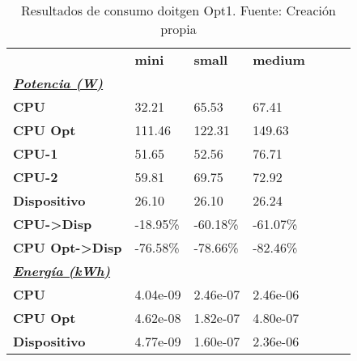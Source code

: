 \begin{table}[H]
    \centering
    \begin{tabular}{lllllll}
    \rowcolor[HTML]{DAE8FC} \ & \textbf{mini} & \textbf{	small} & \textbf{	medium} \\
    \cellcolor[HTML]{DAE8FC} \textbf{\textbf{{\emph{{\underline{{Potencia (W)}}}}}}} &  & 	 & 	 \\
    \rowcolor[HTML]{EFEFEF} \cellcolor[HTML]{DAE8FC} \textbf{CPU} & 32.21 & 	65.53 & 	67.41 \\
    \cellcolor[HTML]{DAE8FC} \textbf{CPU Opt} & 111.46 & 	122.31 & 	149.63 \\
    \rowcolor[HTML]{EFEFEF} \cellcolor[HTML]{DAE8FC} \textbf{\quad CPU-1} & 51.65 & 	52.56 & 	76.71 \\
    \cellcolor[HTML]{DAE8FC} \textbf{\quad CPU-2} & 59.81 & 	69.75 & 	72.92 \\
    \rowcolor[HTML]{EFEFEF} \cellcolor[HTML]{DAE8FC} \textbf{Dispositivo} & 26.10 & 	26.10 & 	26.24 \\
    \cellcolor[HTML]{DAE8FC} \textbf{CPU->Disp} & -18.95\% & 	-60.18\% & 	-61.07\% \\
    \rowcolor[HTML]{EFEFEF} \cellcolor[HTML]{DAE8FC} \textbf{CPU Opt->Disp} & -76.58\% & 	-78.66\% & 	-82.46\% \\
    \cellcolor[HTML]{DAE8FC} \textbf{\textbf{{\emph{{\underline{{Energía (kWh)}}}}}}} &  & 	 & 	 \\
    \rowcolor[HTML]{EFEFEF} \cellcolor[HTML]{DAE8FC} \textbf{CPU} & 4.04e-09 & 	2.46e-07 & 	2.46e-06 \\
    \cellcolor[HTML]{DAE8FC} \textbf{CPU Opt} & 4.62e-08 & 	1.82e-07 & 	4.80e-07 \\
    \rowcolor[HTML]{EFEFEF} \cellcolor[HTML]{DAE8FC} \textbf{Dispositivo} & 4.77e-09 & 	1.60e-07 & 	2.36e-06 \\
    \end{tabular}
    \caption[Resultados de consumo doitgen Opt1]{{Resultados de consumo doitgen Opt1. Fuente: Creación propia}}
    \label{table_test_doitgen_Opt1_hw_powerResults}
\end{table}